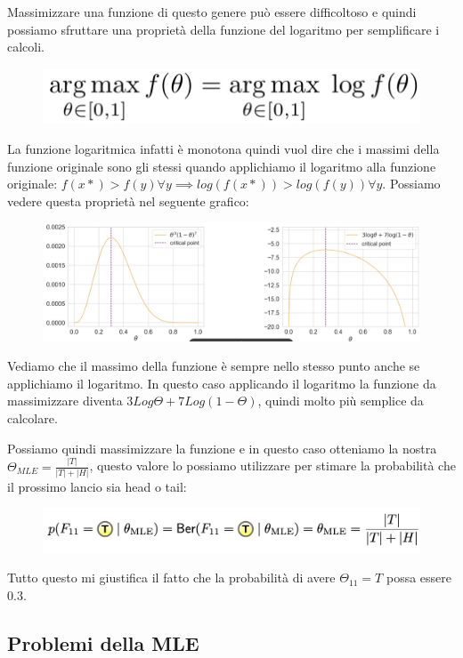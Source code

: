 \documentclass[14pt]{extreport}
\begin{document}
Massimizzare una funzione di questo genere può essere difficoltoso e quindi possiamo sfruttare una proprietà della funzione del logaritmo per
semplificare i calcoli.
\begin{figure}[H]
	\centering
	\includegraphics[width=0.5\linewidth]{23.jpeg}
\end{figure}
La funzione logaritmica infatti è monotona quindi vuol dire che i massimi della funzione originale sono gli stessi quando applichiamo il logaritmo
alla funzione originale: $f(x*) > f(y) \forall y \implies log(f(x*))> log(f(y))  \forall y $. Possiamo vedere questa proprietà nel seguente grafico:
\begin{figure}[H]
	\centering
	\includegraphics[width=\linewidth]{22.jpeg}
\end{figure}

Vediamo che il massimo della funzione è sempre nello stesso punto anche se applichiamo il logaritmo. In questo caso applicando il logaritmo la
funzione da massimizzare diventa $3Log\Theta + 7Log(1-\Theta)$, quindi molto più semplice da calcolare.

Possiamo quindi massimizzare la funzione e in questo caso otteniamo la nostra $\Theta_{MLE} = \frac{|T|}{|T|+|H|}$, questo valore lo possiamo
utilizzare per stimare la probabilità che il prossimo lancio sia head o tail:
\begin{figure}[H]
	\centering
	\includegraphics[width=0.7\linewidth]{24.jpeg}
\end{figure}
Tutto questo mi giustifica il fatto che la probabilità di avere $\Theta_{11} = T$ possa essere 0.3.

\subsection{Problemi della MLE}
\end{document}

